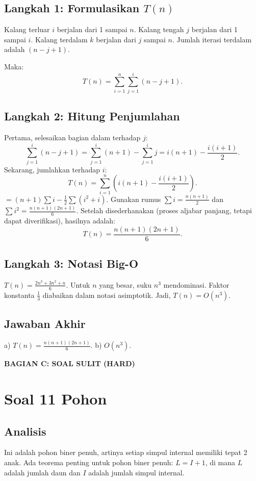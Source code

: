 \documentclass[12pt,a4paper]{article}
\begin{document}
\subsection*{Langkah 1: Formulasikan $T(n)$}
Kalang terluar $i$ berjalan dari 1 sampai $n$.
Kalang tengah $j$ berjalan dari 1 sampai $i$.
Kalang terdalam $k$ berjalan dari $j$ sampai $n$.
Jumlah iterasi terdalam adalah $(n - j + 1)$.

Maka:
\[
T(n) = \sum_{i=1}^{n} \sum_{j=1}^{i} (n - j + 1).
\]

\subsection*{Langkah 2: Hitung Penjumlahan}
Pertama, selesaikan bagian dalam terhadap $j$:
\[
\sum_{j=1}^{i} (n - j + 1) = \sum_{j=1}^{i} (n+1) - \sum_{j=1}^{i} j = i(n+1) - \frac{i(i+1)}{2}.
\]
Sekarang, jumlahkan terhadap $i$:
\[
T(n) = \sum_{i=1}^{n} \left( i(n+1) - \frac{i(i+1)}{2} \right).
\]
$ = (n+1)\sum i - \frac{1}{2}\sum (i^2 + i)$.
Gunakan rumus $\sum i = \frac{n(n+1)}{2}$ dan $\sum i^2 = \frac{n(n+1)(2n+1)}{6}$.
Setelah disederhanakan (proses aljabar panjang, tetapi dapat diverifikasi), hasilnya adalah:
\[
\boxed{T(n) = \frac{n(n+1)(2n+1)}{6}}.
\]

\subsection*{Langkah 3: Notasi Big-O}
$T(n) = \frac{2n^3 + 3n^2 + n}{6}$. Untuk $n$ yang besar, suku $n^3$ mendominasi. Faktor konstanta $\frac{1}{3}$ diabaikan dalam notasi asimptotik.
Jadi, $T(n) = O(n^3)$.

\subsection*{Jawaban Akhir}
a) $T(n) = \frac{n(n+1)(2n+1)}{6}$. \quad b) $O(n^3)$. 

\newpage
\begin{center}
\Large \textbf{BAGIAN C: SOAL SULIT (HARD)}
\end{center}

\section*{Soal 11 Pohon}
\subsection*{Analisis}
Ini adalah pohon biner penuh, artinya setiap simpul internal memiliki tepat 2 anak. Ada teorema penting untuk pohon biner penuh: $L = I + 1$, di mana $L$ adalah jumlah daun dan $I$ adalah jumlah simpul internal.
\end{document}
